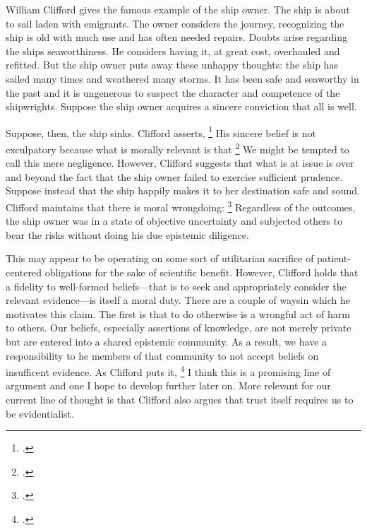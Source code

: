\documentclass[letterpaper,notitlepage,12pt]{article}
\begin{document}
William Clifford gives the famous example of the ship owner.
The ship is about to sail laden with emigrants.
The owner considers the journey, recognizing the ship is old with much use and
has often needed repairs.
Doubts arise regarding the ships seaworthiness.
He considers having it, at great cost, overhauled and refitted.
But the ship owner puts away these unhappy thoughts: the ship has sailed many
times and weathered many storms.
It has been safe and seaworthy in the past and it is ungenerous to suspect the
character and competence of the shipwrights.
Suppose the ship owner acquires a sincere conviction that all is well.

Suppose, then, the ship sinks.
Clifford asserts, \footcite[p. 339]{clifford_ethics_1886}
His sincere belief is not exculpatory because what is morally relevant is that
\footcite[p. 340]{clifford_ethics_1886}
We might be tempted to call this mere negligence.
However, Clifford suggests that what is at issue is over and beyond the fact
that the ship owner failed to exercise sufficient prudence.
Suppose instead that the ship happily makes it to her destination safe and
sound.
Clifford maintains that there is moral wrongdoing: \footcite[p. 340]{clifford_ethics_1886}
Regardless of the outcomes, the ship owner was in a state of objective
uncertainty and subjected others to bear the risks without doing his due
epistemic diligence.

This may appear to be operating on some sort of utilitarian sacrifice of
patient-centered obligations for the sake of scientific benefit.
However, Clifford holds that a fidelity to well-formed beliefs---that is to seek
and appropriately consider the relevant evidence---is itself a moral duty.
There are a couple of waysin which he motivates this claim.
The first is that to do otherwise is a wrongful act of harm to others.
Our beliefs, especially assertions of knowledge, are not merely private but are
entered into a shared epistemic community.
As a result, we have a responsibility to he members of that community to not
accept beliefs on insufficent evidence.
As Clifford puts it, \footcite[p. 344]{clifford_ethics_1886}
I think this is a promising line of argument and one I hope to develop further
later on.
More relevant for our current line of thought is that Clifford also argues that
trust itself requires us to be evidentialist.
\end{document}
